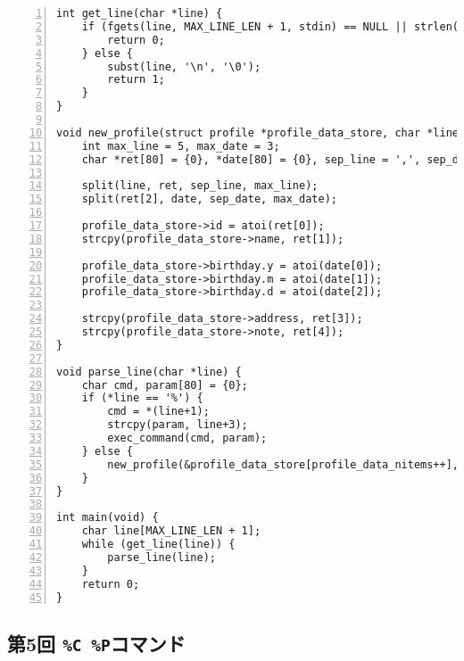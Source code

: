 \documentclass[autodetect-engine,dvi=dvipdfmx,ja=standard,
               a4j,11pt]{bxjsarticle}
\begin{document}
\begin{Verbatim}[numbers=left, xleftmargin=10mm, numbersep=6pt,
    fontsize=\small, baselinestretch=0.8]
int get_line(char *line) {
    if (fgets(line, MAX_LINE_LEN + 1, stdin) == NULL || strlen(line) > MAX_LINE_LEN || *line == '\n') {
        return 0;
    } else {
        subst(line, '\n', '\0');
        return 1;
    }
}

void new_profile(struct profile *profile_data_store, char *line) {
    int max_line = 5, max_date = 3;
    char *ret[80] = {0}, *date[80] = {0}, sep_line = ',', sep_date = '-';

    split(line, ret, sep_line, max_line);
    split(ret[2], date, sep_date, max_date);

    profile_data_store->id = atoi(ret[0]);
    strcpy(profile_data_store->name, ret[1]);

    profile_data_store->birthday.y = atoi(date[0]);
    profile_data_store->birthday.m = atoi(date[1]);
    profile_data_store->birthday.d = atoi(date[2]);

    strcpy(profile_data_store->address, ret[3]);
    strcpy(profile_data_store->note, ret[4]);
}

void parse_line(char *line) {
    char cmd, param[80] = {0};
    if (*line == '%') {
        cmd = *(line+1);
        strcpy(param, line+3);
        exec_command(cmd, param);
    } else {
        new_profile(&profile_data_store[profile_data_nitems++], line);
    }
}

int main(void) {
    char line[MAX_LINE_LEN + 1];
    while (get_line(line)) {
        parse_line(line);
    }
    return 0;
}

\end{Verbatim}

\subsection{第5回 \texttt{\%C \%P}コマンド} \label{code:5}
\end{document}
